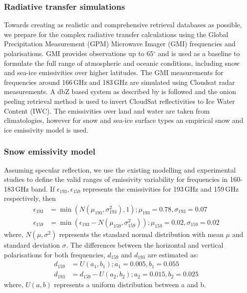 \documentclass[12pt,oneside,a4paper]{article}
\begin{document}
\subsubsection{Radiative transfer simulations}
%
\label{sec:radiative_transfer}
Towards creating as realistic and comprehensive retrieval databases as possible, we prepare for the complex radiative transfer calculations using the Global Precipitation Measurement (GPM) Microwave Imager (GMI) frequencies and polarisations. GMI provides observations up to 65$^{\circ}$ and is used as a baseline to formulate the full range of atmospheric and oceanic conditions, including snow and sea-ice emissivities over higher latitudes. The GMI measurements for frequencies around 166\,GHz and 183\,GHz are simulated using Cloudsat radar measurements. A dbZ based system as described by \citet{ekelund:using:20} is followed and the onion peeling retrieval method is used to invert CloudSat reflectivities to Ice Water Content (IWC). The emissivities over land and water are taken from climatologies, however for snow and sea-ice surface types an empirical snow and ice emissivity model is used.

\subsubsection*{Snow emissivity model}
%
Assuming specular reflection, we use the existing modelling and experimental studies\citep{harlow:2009:milli, harlow:2012:tundr,hewison:2002:airbo} to define the valid ranges of emissivity variability for frequencies in 160-183\,GHz band. If $\epsilon_{193}, \epsilon_{159}$ represents the emissivities for 193\,GHz and 159\,GHz respectively, then
\begin{align}
\epsilon_{193}& = \min({N(\mu_{193}, \sigma_{193}^{2}), 1}) ; \mu_{193} = 0.78, \sigma_{193} = 0.07 \\
\epsilon_{159}& = \min(\epsilon_{193} - N(\mu_{159}, \sigma_{159}^{2})) ;  \mu_{159} = 0.02, \sigma_{159} = 0.02\,
\end{align}
where, $N(\mu, \sigma^{2})$ represents the standard normal distribution with mean $\mu$ and standard deviation $\sigma$. The differences between the horizontal and vertical polarisations for both frequencies, $d_{159}$ and $d_{193}$ are estimated as:
\begin{align}
d_{159}& = U(a_1, b_1) ; a_1 = 0.005, b_1 = 0.055\\
d_{193}& = d_{159} - U(a_2, b_2) ; a_2 = 0.015, b_2 = 0.025 \,
\end{align}
where, $U(a, b)$ represents a uniform distribution between a and b. 
\end{document}
